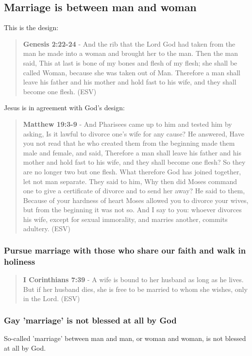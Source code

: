 \documentclass[11pt]{article}
\begin{document}
\subsection{Marriage is between man and woman}
\label{sec:org229a7d2}
This is the design:

\begin{quote}
\textbf{Genesis 2:22-24} - And the rib that the Lord God had taken from the man he made into a woman and brought her to the man. Then the man said, This at last is bone of my bones and flesh of my flesh; she shall be called Woman, because she was taken out of Man. Therefore a man shall leave his father and his mother and hold fast to his wife, and they shall become one flesh. (ESV)
\end{quote}

Jesus is in agreement with God's design:

\begin{quote}
\textbf{Matthew 19:3-9} - And Pharisees came up to him and tested him by asking, Is it lawful to divorce one's wife for any cause? He answered, Have you not read that he who created them from the beginning made them male and female, and said, Therefore a man shall leave his father and his mother and hold fast to his wife, and they shall become one flesh? So they are no longer two but one flesh. What therefore God has joined together, let not man separate. They said to him, Why then did Moses command one to give a certificate of divorce and to send her away? He said to them, Because of your hardness of heart Moses allowed you to divorce your wives, but from the beginning it was not so. And I say to you: whoever divorces his wife, except for sexual immorality, and marries another, commits adultery. (ESV)
\end{quote}

\subsubsection{Pursue marriage with those who share our faith and walk in holiness}
\label{sec:org187b91f}
\begin{quote}
\textbf{I Corinthians 7:39} - A wife is bound to her husband as long as he lives. But if her husband dies, she is free to be married to whom she wishes, only in the Lord. (ESV)
\end{quote}

\subsubsection{Gay 'marriage' is not blessed at all by God}
\label{sec:orge40fd08}
So-called 'marriage' between man and man, or woman and woman, is not blessed at all by God.
\end{document}
